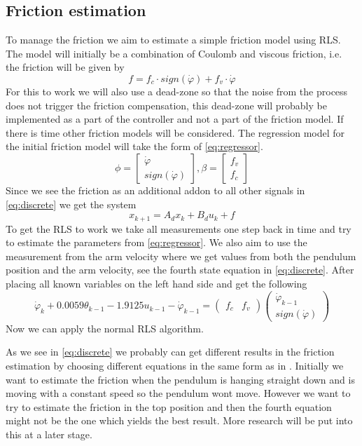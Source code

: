 \documentclass[10pt,a4paper]{article}
\begin{document}
\subsection{Friction estimation}
\label{sec:fricEst}
To manage the friction we aim to estimate a simple friction model using RLS. The model will initially be a combination of Coulomb and viscous friction, i.e. the friction will be given by $$f=f_c\cdot sign(\dot{\varphi})+f_v\cdot \dot{\varphi}$$
For this to work we will also use a dead-zone so that the noise from the process does not trigger the friction compensation, this dead-zone will probably be implemented as a part of the controller and not a part of the friction model. If there is time other friction models will be considered.
The regression model for the initial friction model will take the form of \ref{eq:regressor}.
\begin{equation}
\phi=\begin{bmatrix}
\dot{\varphi} \\
sign(\dot{\varphi})
\end{bmatrix}, \beta = \begin{bmatrix}
f_v\\
f_c
\end{bmatrix}
\label{eq:regressor}
\end{equation}
Since we see the friction as an additional addon to all other signals in \ref{eq:discrete} we get the system
$$x_{k+1} = A_dx_k + B_du_k + f$$
To get the RLS to work we take all measurements one step back in time and try to estimate the parameters from \ref{eq:regressor}. We also aim to use the measurement from the arm velocity where we get values from both the pendulum position and the arm velocity, see the fourth state equation in \ref{eq:discrete}. After placing all known variables on the left hand side and get the following
\begin{equation}
\dot{\varphi}_k + 0.0059\theta_{k-1}-1.9125u_{k-1}-\dot{\varphi}_{k-1} = \begin{pmatrix}
f_c & f_v
\end{pmatrix}\begin{pmatrix}
\dot{\varphi}_{k-1}\\
sign(\dot{\varphi})
\end{pmatrix}
\label{eq:estim}
\end{equation}
Now we can apply the normal RLS algorithm.

As we see in \ref{eq:discrete} we probably can get different results in the friction estimation by choosing different equations in the same form as in \label{eq:estim}. Initially we want to estimate the friction when the pendulum is hanging straight down and is moving with a constant speed so the pendulum wont move. However we want to try to estimate the friction in the top position and then the fourth equation might not be the one which yields the best result. More research will be put into this at a later stage.
\end{document}
